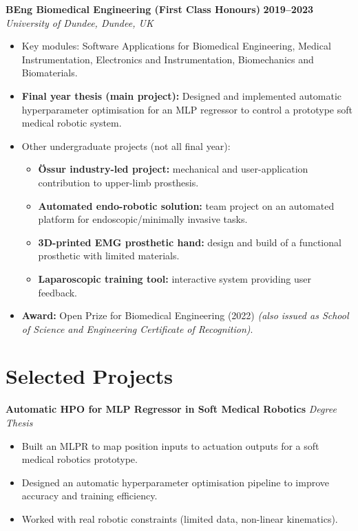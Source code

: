 \documentclass[a4paper,11pt]{article}
\begin{document}
\textbf{BEng Biomedical Engineering (First Class Honours)} \hfill \textbf{2019--2023}\\
\textit{University of Dundee, Dundee, UK}
\begin{itemize}
    \item Key modules: Software Applications for Biomedical Engineering, Medical Instrumentation, Electronics and Instrumentation, Biomechanics and Biomaterials.
    \item \textbf{Final year thesis (main project):} Designed and implemented automatic hyperparameter optimisation for an MLP regressor to control a prototype soft medical robotic system.
    \item Other undergraduate projects (not all final year):
    \begin{itemize}
        \item \textbf{Össur industry-led project:} mechanical and user-application contribution to upper-limb prosthesis.
        \item \textbf{Automated endo-robotic solution:} team project on an automated platform for endoscopic/minimally invasive tasks.
        \item \textbf{3D-printed EMG prosthetic hand:} design and build of a functional prosthetic with limited materials.
        \item \textbf{Laparoscopic training tool:} interactive system providing user feedback.
    \end{itemize}
    \item \textbf{Award:} Open Prize for Biomedical Engineering (2022) \emph{(also issued as School of Science and Engineering Certificate of Recognition)}.
\end{itemize}

\section*{Selected Projects}

\textbf{Automatic HPO for MLP Regressor in Soft Medical Robotics} \hfill \textit{Degree Thesis}
\begin{itemize}
    \item Built an MLPR to map position inputs to actuation outputs for a soft medical robotics prototype.
    \item Designed an automatic hyperparameter optimisation pipeline to improve accuracy and training efficiency.
    \item Worked with real robotic constraints (limited data, non-linear kinematics).
\end{itemize}
\end{document}
